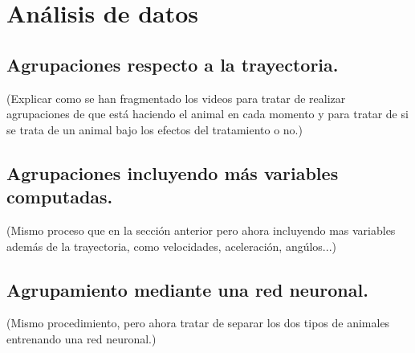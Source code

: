 \blankpage
\section{Análisis de datos} \label{sec:análisis}

\subsection{Agrupaciones respecto a la trayectoria.}
(Explicar como se han fragmentado los videos para tratar de realizar agrupaciones de que está haciendo el animal en cada momento y para tratar de si se trata de un animal bajo los efectos del tratamiento o no.)

\subsection{Agrupaciones incluyendo más variables computadas.}
(Mismo proceso que en la sección anterior pero ahora incluyendo mas variables además de la trayectoria, como velocidades, aceleración, angúlos...)

\subsection{Agrupamiento mediante una red neuronal.}
(Mismo procedimiento, pero ahora tratar de separar los dos tipos de animales entrenando una red neuronal.)